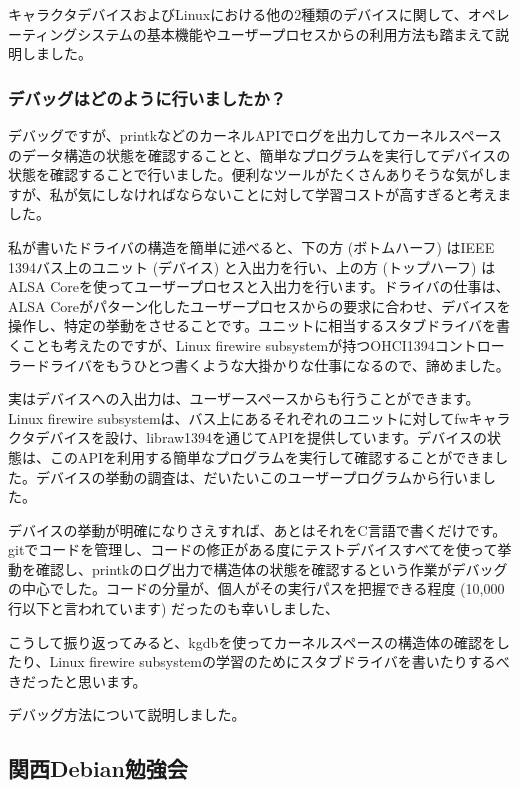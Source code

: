 \documentclass[mingoth,a4paper]{jsarticle}
\begin{document}
キャラクタデバイスおよびLinuxにおける他の2種類のデバイスに関して、オペレーティングシステムの基本機能やユーザープロセスからの利用方法も踏まえて説明しました。


\subsubsection{デバッグはどのように行いましたか？}

デバッグですが、printkなどのカーネルAPIでログを出力してカーネルスペースのデータ構造の状態を確認することと、簡単なプログラムを実行してデバイスの状態を確認することで行いました。便利なツールがたくさんありそうな気がしますが、私が気にしなければならないことに対して学習コストが高すぎると考えました。

私が書いたドライバの構造を簡単に述べると、下の方 (ボトムハーフ) はIEEE 1394バス上のユニット (デバイス) と入出力を行い、上の方 (トップハーフ) はALSA Coreを使ってユーザープロセスと入出力を行います。ドライバの仕事は、ALSA Coreがパターン化したユーザープロセスからの要求に合わせ、デバイスを操作し、特定の挙動をさせることです。ユニットに相当するスタブドライバを書くことも考えたのですが、Linux firewire subsystemが持つOHCI1394コントローラードライバをもうひとつ書くような大掛かりな仕事になるので、諦めました。

実はデバイスへの入出力は、ユーザースペースからも行うことができます。Linux firewire subsystemは、バス上にあるそれぞれのユニットに対してfwキャラクタデバイスを設け、libraw1394を通じてAPIを提供しています。デバイスの状態は、このAPIを利用する簡単なプログラムを実行して確認することができました。デバイスの挙動の調査は、だいたいこのユーザープログラムから行いました。

デバイスの挙動が明確になりさえすれば、あとはそれをC言語で書くだけです。gitでコードを管理し、コードの修正がある度にテストデバイスすべてを使って挙動を確認し、printkのログ出力で構造体の状態を確認するという作業がデバッグの中心でした。コードの分量が、個人がその実行パスを把握できる程度 (10,000行以下と言われています) だったのも幸いしました、

こうして振り返ってみると、kgdbを使ってカーネルスペースの構造体の確認をしたり、Linux firewire subsystemの学習のためにスタブドライバを書いたりするべきだったと思います。

デバッグ方法について説明しました。




\subsection{関西Debian勉強会}
\end{document}
